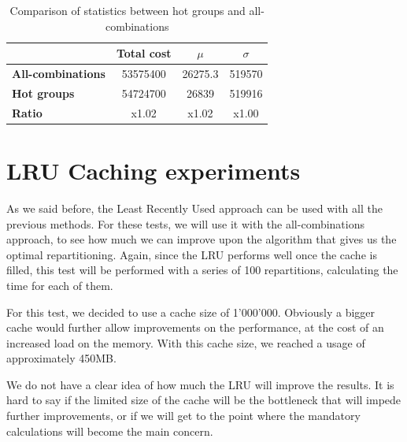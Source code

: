 \begin{table}[!htb]
  \centering
  \begin{tabular}{l c c c}
    \hline
    & \textbf{Total cost} & \textbf{$\mu$} & \textbf{$\sigma$} \\
    \hline
    \textbf{All-combinations} & 53575400 & 26275.3 & 519570\\
    \textbf{Hot groups} & 54724700 & 26839 & 519916 \\
    \hline
    \textbf{Ratio} & x1.02 & x1.02 & x1.00 \\
  \end{tabular}
  \caption{Comparison of statistics between hot groups and all-combinations}\label{tab:mean-stddev-hot-all}
\end{table}

\section{LRU Caching experiments}\label{sec:lru-caching-tests}
As we said before, the Least Recently Used approach can be used with all the previous methods. For these tests, we will use it with the all-combinations approach, to see how much we can improve upon the algorithm that gives us the optimal repartitioning. Again, since the LRU performs well once the cache is filled, this test will be performed with a series of 100 repartitions, calculating the time for each of them.

For this test, we decided to use a cache size of 1'000'000. Obviously a bigger cache would further allow improvements on the performance, at the cost of an increased load on the memory. With this cache size, we reached a usage of approximately 450MB.

We do not have a clear idea of how much the LRU will improve the results. It is hard to say if the limited size of the cache will be the bottleneck that will impede further improvements, or if we will get to the point where the mandatory calculations will become the main concern.

